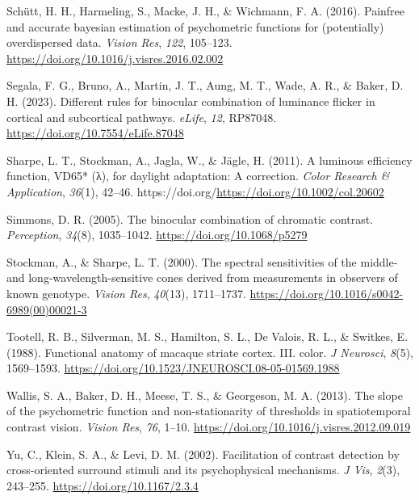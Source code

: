 \documentclass[
  letterpaper,
  DIV=11,
  numbers=noendperiod]{scrartcl}
\newlength{\cslhangindent}
\newlength{\cslentryspacingunit} %
\newenvironment{CSLReferences}[2] %
 {%
  \setlength{\parindent}{0pt}
  \ifodd #1
  \let\oldpar\par
  \def\par{\hangindent=\cslhangindent\oldpar}
  \fi
  \setlength{\parskip}{#2\cslentryspacingunit}
 }%
 {}
\begin{document}
\begin{CSLReferences}{1}{0}
\leavevmode{}%
Schütt, H. H., Harmeling, S., Macke, J. H., \& Wichmann, F. A. (2016).
Painfree and accurate bayesian estimation of psychometric functions for
(potentially) overdispersed data. \emph{Vision Res}, \emph{122},
105--123. \url{https://doi.org/10.1016/j.visres.2016.02.002}

\leavevmode{}%
Segala, F. G., Bruno, A., Martin, J. T., Aung, M. T., Wade, A. R., \&
Baker, D. H. (2023). Different rules for binocular combination of
luminance flicker in cortical and subcortical pathways. \emph{eLife},
\emph{12}, RP87048. \url{https://doi.org/10.7554/eLife.87048}

\leavevmode{}%
Sharpe, L. T., Stockman, A., Jagla, W., \& Jägle, H. (2011). A luminous
efficiency function, VD65* (λ), for daylight adaptation: A correction.
\emph{Color Research \& Application}, \emph{36}(1), 42--46.
https://doi.org/\url{https://doi.org/10.1002/col.20602}

\leavevmode{}%
Simmons, D. R. (2005). The binocular combination of chromatic contrast.
\emph{Perception}, \emph{34}(8), 1035--1042.
\url{https://doi.org/10.1068/p5279}

\leavevmode{}%
Stockman, A., \& Sharpe, L. T. (2000). The spectral sensitivities of the
middle- and long-wavelength-sensitive cones derived from measurements in
observers of known genotype. \emph{Vision Res}, \emph{40}(13),
1711--1737. \url{https://doi.org/10.1016/s0042-6989(00)00021-3}

\leavevmode{}%
Tootell, R. B., Silverman, M. S., Hamilton, S. L., De Valois, R. L., \&
Switkes, E. (1988). Functional anatomy of macaque striate cortex. III.
color. \emph{J Neurosci}, \emph{8}(5), 1569--1593.
\url{https://doi.org/10.1523/JNEUROSCI.08-05-01569.1988}

\leavevmode{}%
Wallis, S. A., Baker, D. H., Meese, T. S., \& Georgeson, M. A. (2013).
The slope of the psychometric function and non-stationarity of
thresholds in spatiotemporal contrast vision. \emph{Vision Res},
\emph{76}, 1--10. \url{https://doi.org/10.1016/j.visres.2012.09.019}

\leavevmode{}%
Yu, C., Klein, S. A., \& Levi, D. M. (2002). Facilitation of contrast
detection by cross-oriented surround stimuli and its psychophysical
mechanisms. \emph{J Vis}, \emph{2}(3), 243--255.
\url{https://doi.org/10.1167/2.3.4}

\end{CSLReferences}
\end{document}
